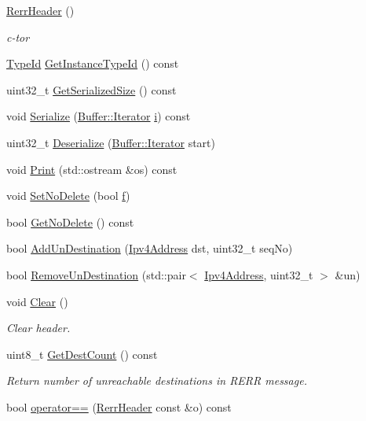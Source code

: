 \begin{DoxyCompactItemize}
\item 
\hyperlink{classns3_1_1aodv_1_1RerrHeader_a56f2fd5e7c455c3f76e63c536861fa9f}{Rerr\+Header} ()
\begin{DoxyCompactList}\small\item\em c-\/tor \end{DoxyCompactList}\item 
\hyperlink{classns3_1_1TypeId}{Type\+Id} \hyperlink{classns3_1_1aodv_1_1RerrHeader_a3f7b3b750903d1c2acf1c4fc8ea1ba1a}{Get\+Instance\+Type\+Id} () const 
\item 
uint32\+\_\+t \hyperlink{classns3_1_1aodv_1_1RerrHeader_a773167b93215445b454c3ffc345e2f44}{Get\+Serialized\+Size} () const 
\item 
void \hyperlink{classns3_1_1aodv_1_1RerrHeader_aa454365cae7dbbe5e559ca603f0fd54d}{Serialize} (\hyperlink{classns3_1_1Buffer_1_1Iterator}{Buffer\+::\+Iterator} \hyperlink{lte__uplink__power__control_8m_a6f6ccfcf58b31cb6412107d9d5281426}{i}) const 
\item 
uint32\+\_\+t \hyperlink{classns3_1_1aodv_1_1RerrHeader_a6b1816ffe9a9cc9d4f4eb57f25780472}{Deserialize} (\hyperlink{classns3_1_1Buffer_1_1Iterator}{Buffer\+::\+Iterator} start)
\item 
void \hyperlink{classns3_1_1aodv_1_1RerrHeader_a31b7c8fe34a52aabd82078cdaecc51d2}{Print} (std\+::ostream \&os) const 
\item 
void \hyperlink{classns3_1_1aodv_1_1RerrHeader_a9adafeb01f978374f9d4ed888e864894}{Set\+No\+Delete} (bool \hyperlink{80211b_8c_ae7ffc1a8f84fa47a0812b2f2b9627132}{f})
\item 
bool \hyperlink{classns3_1_1aodv_1_1RerrHeader_a25cf76da4ca0277eedbc8b3c5621c8b6}{Get\+No\+Delete} () const 
\item 
bool \hyperlink{classns3_1_1aodv_1_1RerrHeader_a9cac1aabb34a05418aeca37121a0d7fe}{Add\+Un\+Destination} (\hyperlink{classns3_1_1Ipv4Address}{Ipv4\+Address} dst, uint32\+\_\+t seq\+No)
\item 
bool \hyperlink{classns3_1_1aodv_1_1RerrHeader_abf21493b95d50e6a41c2a79a9180ebc2}{Remove\+Un\+Destination} (std\+::pair$<$ \hyperlink{classns3_1_1Ipv4Address}{Ipv4\+Address}, uint32\+\_\+t $>$ \&un)
\item 
void \hyperlink{classns3_1_1aodv_1_1RerrHeader_a14259f24bc6f0e6ff9c5e375e60fe0c3}{Clear} ()
\begin{DoxyCompactList}\small\item\em Clear header. \end{DoxyCompactList}\item 
uint8\+\_\+t \hyperlink{classns3_1_1aodv_1_1RerrHeader_aa1b0b05b9800bb6804a6f3610825ec7f}{Get\+Dest\+Count} () const 
\begin{DoxyCompactList}\small\item\em Return number of unreachable destinations in R\+E\+RR message. \end{DoxyCompactList}\item 
bool \hyperlink{classns3_1_1aodv_1_1RerrHeader_a9ae4366ccee95cc44c7443ed15b030e7}{operator==} (\hyperlink{classns3_1_1aodv_1_1RerrHeader}{Rerr\+Header} const \&o) const 
\end{DoxyCompactItemize}
